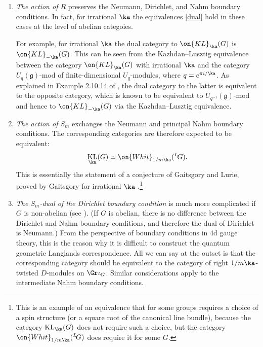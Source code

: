 \documentclass[11pt,reqno]{amsart}
\theoremstyle{plain}
\numberwithin{equation}{section}
\newcommand{\g}{\mathfrak{g}}
\def\neg{\negthinspace}
\def\LG{{}^L\neg G}
\DeclareMathOperator{\KL}{KL}
\theoremstyle{definition}
\begin{document}
\bigskip

\begin{enumerate}

\item {\em The action of $R$} preserves the Neumann, Dirichlet, and
  Nahm boundary conditions. In fact, for irrational $\ka$ the
  equivalences \eqref{dual} hold in these cases at the level of
  abelian categoies.

  For example, for irrational $\ka$ the dual category to
  $\on{KL}_\ka(G)$ is $\on{KL}_{-\ka}(G)$. This can be seen from the
  Kazhdan--Lusztig equivalence between the category $\on{KL}_\ka(G)$
  with irrational $\ka$ and the category $U_q(\g)$-mod of
  finite-dimensional $U_q$-modules, where $q=e^{\pi i/\ka}$. As
  explained in Example 2.10.14 of \cite{EGNO}, the dual category to
  the latter is equivalent to the opposite category, which is known to
  be equivalent to $U_{q^{-1}}(\g)$-mod and hence to
  $\on{KL}_{-\ka}(G)$ via the Kazhdan--Lusztig equivalence.

\bigskip

\item {\em The action of $S_m$} exchanges the Neumann and principal
  Nahm boundary conditions. The corresponding categories are therefore
  expected to be equivalent:
\begin{equation}    \label{KLWhit}
\KL_\ka(G) \simeq \on{Whit}_{1/m\ka}(\LG).
\end{equation}
This is essentially the statement of a conjecture of Gaitsgory and
Lurie, proved by Gaitsgory for irrational $\ka$
\cite{gaitsW,gaitsQ}.\footnote{This is an example of an equivalence
  that for some groups requires a choice of a spin structure (or a
  square root of the canonical line bundle), because the category
  $\KL_\ka(G)$ does not require such a choice, but the category
  $\on{Whit}_{1/m\ka}(\LG)$ does require it for some $G$.}

\bigskip

\item {\em The $S_m$-dual of the Dirichlet boundary condition} is much
  more complicated if $G$ is non-abelian (see \cite{GW1,GW2,
    Ga1,Ga2}). (If $G$ is abelian, there is no difference between the
  Dirichlet and Nahm boundary conditions, and therefore the dual of
  Dirichlet is Neumann.) From the perspective of boundary conditions in
  4d gauge theory, this is the reason why it is difficult to construct
  the quantum geometric Langlands correspondence. All we can say at
  the outset is that the corresponding category should be equivalent
  to the category of right $1/m\ka$-twisted $D$-modules on
  $\Gr_{\LG}$. Similar considerations apply to the intermediate Nahm
  boundary conditions.


\end{enumerate}
\end{document}
